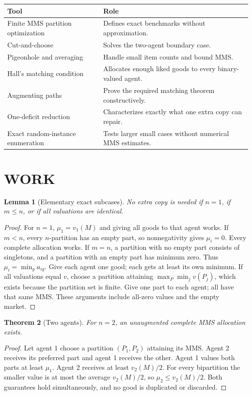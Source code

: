\documentclass[11pt,a4paper]{article}
\newtheorem{theorem}{Theorem}[section]
\newtheorem{lemma}[theorem]{Lemma}
\theoremstyle{remark}\newtheorem{remark}[theorem]{Remark}
\begin{document}
\begin{center}\begin{tabular}{p{.25\linewidth}p{.66\linewidth}}\toprule Tool&Role\\\midrule
Finite MMS partition optimization&Defines exact benchmarks without approximation.\\
Cut-and-choose&Solves the two-agent boundary case.\\
Pigeonhole and averaging&Handle small item counts and bound MMS.\\
Hall's matching condition&Allocates enough liked goods to every binary-valued agent.\\
Augmenting paths&Prove the required matching theorem constructively.\\
One-deficit reduction&Characterizes exactly what one extra copy can repair.\\
Exact random-instance enumeration&Tests larger small cases without numerical MMS estimates.\\\bottomrule\end{tabular}\end{center}

\section{WORK}
\begin{lemma}[Elementary exact subcases]\label{lem:basicMMS}
No extra copy is needed if $n=1$, if $m\le n$, or if all valuations are identical.
\end{lemma}
\begin{proof}
For $n=1$, $\mu_1=v_1(M)$ and giving all goods to that agent works. If $m<n$, every $n$-partition has an empty part, so nonnegativity gives $\mu_i=0$. Every complete allocation works. If $m=n$, a partition with no empty part consists of singletons, and a partition with an empty part has minimum zero. Thus $\mu_i=\min_ga_{ig}$. Give each agent one good; each gets at least its own minimum. If all valuations equal $v$, choose a partition attaining $\max_P\min_jv(P_j)$, which exists because the partition set is finite. Give one part to each agent; all have that same MMS. These arguments include all-zero values and the empty market.
\end{proof}

\begin{theorem}[Two agents]\label{thm:twoMMS}
For $n=2$, an unaugmented complete MMS allocation exists.
\end{theorem}
\begin{proof}
Let agent 1 choose a partition $(P_1,P_2)$ attaining its MMS. Agent 2 receives its preferred part and agent 1 receives the other. Agent 1 values both parts at least $\mu_1$. Agent 2 receives at least $v_2(M)/2$. For every bipartition the smaller value is at most the average $v_2(M)/2$, so $\mu_2\le v_2(M)/2$. Both guarantees hold simultaneously, and no good is duplicated or discarded.
\end{proof}
\end{document}
